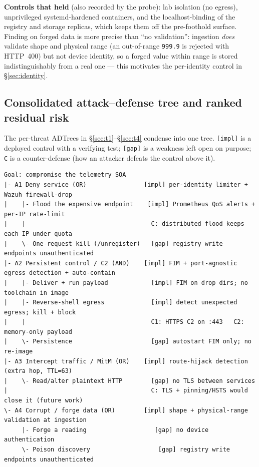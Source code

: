\documentclass[11pt,a4paper]{article}
\newcommand{\code}[1]{\texttt{\small #1}}
\begin{document}
\noindent\textbf{Controls that held} (also recorded by the probe): lab isolation (no egress),
unprivileged systemd-hardened containers, and the localhost-binding of the registry and storage
replicas, which keeps them off the pre-foothold surface. Finding on forged data is more precise
than ``no validation'': ingestion \emph{does} validate shape and physical range (an out-of-range
\code{999.9} is rejected with HTTP~400) but not device identity, so a forged value within range is
stored indistinguishably from a real one --- this motivates the per-identity control in
\S\ref{sec:identity}.

\subsection{Consolidated attack--defense tree and ranked residual risk}
The per-threat ADTrees in \S\ref{sec:t1}--\S\ref{sec:t4} condense into one tree. \code{[impl]} is a
deployed control with a verifying test; \code{[gap]} is a weakness left open on purpose; \code{C} is
a counter-defense (how an attacker defeats the control above it).
\begin{lstlisting}
Goal: compromise the telemetry SOA
|- A1 Deny service (OR)                [impl] per-identity limiter + Wazuh firewall-drop
|    |- Flood the expensive endpoint    [impl] Prometheus QoS alerts + per-IP rate-limit
|    |                                   C: distributed flood keeps each IP under quota
|    \- One-request kill (/unregister)   [gap] registry write endpoints unauthenticated
|- A2 Persistent control / C2 (AND)    [impl] FIM + port-agnostic egress detection + auto-contain
|    |- Deliver + run payload            [impl] FIM on drop dirs; no toolchain in image
|    |- Reverse-shell egress             [impl] detect unexpected egress; kill + block
|    |                                   C1: HTTPS C2 on :443   C2: memory-only payload
|    \- Persistence                      [gap] autostart FIM only; no re-image
|- A3 Intercept traffic / MitM (OR)    [impl] route-hijack detection (extra hop, TTL=63)
|    \- Read/alter plaintext HTTP        [gap] no TLS between services
|                                        C: TLS + pinning/HSTS would close it (future work)
\- A4 Corrupt / forge data (OR)        [impl] shape + physical-range validation at ingestion
     |- Forge a reading                   [gap] no device authentication
     \- Poison discovery                   [gap] registry write endpoints unauthenticated
\end{lstlisting}
\end{document}
